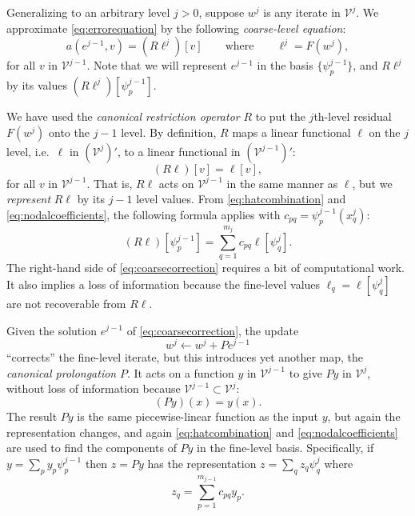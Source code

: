 \documentclass[letterpaper,final,12pt,reqno]{amsart}
\theoremstyle{claim}
\numberwithin{equation}{section}
\numberwithin{figure}{section}
\numberwithin{table}{section}
\numberwithin{theorem}{section}
\begin{document}
Generalizing to an arbitrary level $j>0$, suppose $w^j$ is any iterate in $\mathcal{V}^j$.  We approximate \eqref{eq:errorequation} by the following \emph{coarse-level equation}:
\begin{equation}
  a(e^{j-1},v) = (R\ell^j)[v] \qquad \text{where} \qquad \ell^j = F(w^j),  \label{eq:coarsecorrection}
\end{equation}
for all $v$ in $\mathcal{V}^{j-1}$.  Note that we will represent $e^{j-1}$ in the basis $\{\psi_p^{j-1}\}$, and $R\ell^j$ by its values $(R\ell^j)[\psi_p^{j-1}]$.

We have used the \emph{canonical restriction operator} $R$ to put the $j$th-level residual $F(w^j)$ onto the $j-1$ level.  By definition, $R$ maps a linear functional $\ell$ on the $j$ level, i.e.~$\ell$ in $(\mathcal{V}^j)'$, to a linear functional in $(\mathcal{V}^{j-1})'$:
\begin{equation}
  (R \ell)[v] = \ell[v], \label{eq:canonicalrestriction}
\end{equation}
for all $v$ in $\mathcal{V}^{j-1}$.  That is, $R \ell$ acts on $\mathcal{V}^{j-1}$ in the same manner as $\ell$, but we \emph{represent} $R\ell$ by its $j-1$ level values.  From \eqref{eq:hatcombination} and \eqref{eq:nodalcoefficients}, the following formula applies with $c_{pq}=\psi_p^{j-1}(x_q^j)$:
\begin{equation}
  (R \ell)[\psi_p^{j-1}] = \sum_{q=1}^{m_j} c_{pq} \ell[\psi_q^j].  \label{eq:canonicalrestrictionaction}
\end{equation}
The right-hand side of \eqref{eq:coarsecorrection} requires a bit of computational work.  It also implies a loss of information because the fine-level values $\ell_q=\ell[\psi_q^j]$ are not recoverable from $R\ell$.

Given the solution $e^{j-1}$ of \eqref{eq:coarsecorrection}, the update
\begin{equation}
  w^j \gets w^j + P e^{j-1}  \label{eq:update}
\end{equation}
``corrects'' the fine-level iterate, but this introduces yet another map, the \emph{canonical prolongation} $P$.  It acts on a function $y$ in $\mathcal{V}^{j-1}$ to give $Py$ in $\mathcal{V}^j$, without loss of information because $\mathcal{V}^{j-1} \subset \mathcal{V}^j$:
\begin{equation}
  (P y)(x) = y(x). \label{eq:canonicalprolongation}
\end{equation}
The result $P y$ is the same piecewise-linear function as the input $y$, but again the representation changes, and again \eqref{eq:hatcombination} and \eqref{eq:nodalcoefficients} are used to find the components of $Py$ in the fine-level basis.  Specifically, if $y=\sum_p y_p \psi_p^{j-1}$ then $z=Py$ has the representation $z = \sum_q z_q \psi_q^j$ where
\begin{equation}
  z_q = \sum_{p=1}^{m_{j-1}} c_{pq} y_p. \label{eq:canonicalprolongationaction}
\end{equation}
\end{document}
